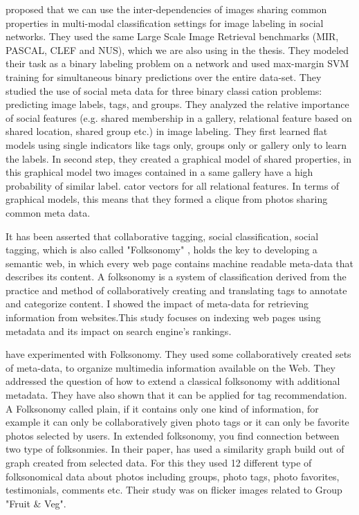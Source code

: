 \citet*{McAuley} proposed that  we can use the inter-dependencies of images sharing common properties in multi-modal classification settings for image labeling in social networks. They used the same Large Scale Image Retrieval benchmarks (MIR, PASCAL, CLEF and NUS), which we are also using in the thesis. They modeled their task as a binary labeling problem on a network and used max-margin SVM training for simultaneous binary predictions over the entire data-set.
They studied the use of social meta data for three binary classication problems: predicting image labels, tags, and groups. They analyzed the relative importance of social features (e.g. shared membership in a gallery, relational feature based on shared location, shared group etc.) in image labeling. They first learned flat models using single indicators like tags only, groups only or gallery only to learn the labels. In second step, they created a graphical model of shared properties, in this graphical model two images contained in a same gallery have a high probability of similar label. cator vectors for all relational features. In terms of graphical models, this means that they formed a clique from photos sharing common meta data.


It has been asserted that collaborative tagging, social classification, social tagging, which is also called "Folksonomy" 
\citet*{wikiFolksonomy}, holds the key to developing a semantic web, in 
which every web page contains machine readable meta-data that 
describes its content. A folksonomy is a system of classification derived from the practice and method of collaboratively creating and translating tags to annotate and categorize content.  I\citet*{webResource} showed the impact of meta-data for retrieving information 
from websites.This study focuses on indexing web pages using metadata and its impact on search engine's rankings.

 have experimented with Folksonomy. They used some collaboratively created sets of meta-data, to organize multimedia information available on the Web. They addressed the question of how to extend a classical folksonomy with additional metadata. They have also shown that it can be applied for tag recommendation. 
 A Folksonomy called plain, if it contains only one kind of information, for example it can only be collaboratively given photo tags or it can only be favorite photos selected by users. In extended folksonomy, you find connection between two type of folksonmies. In their paper, \citet*{kern} has used a similarity graph build out of graph created from selected data. For this they used 12 different type of folksonomical data about photos including groups, photo tags, photo favorites, testimonials, comments etc. Their study was on flicker images related to Group "Fruit \& Veg".

